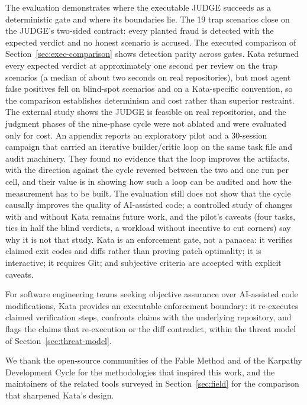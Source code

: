 \documentclass{sbc2019}%
\begin{document}
The evaluation demonstrates where the executable JUDGE succeeds as a
deterministic gate and where its boundaries lie. The 19 trap scenarios close
on the JUDGE's two-sided contract: every planted fraud is detected with the
expected verdict and no honest scenario is accused. The executed comparison of
Section~\ref{sec:exec-comparison} shows detection parity across gates. Kata
returned every expected verdict at approximately one second per review on the
trap scenarios (a median of about two seconds on real repositories), but most
agent false positives fell on blind-spot scenarios and on a Kata-specific
convention, so the comparison establishes determinism and cost rather than
superior restraint. The external study shows the JUDGE is feasible on real
repositories, and the judgment phases of the nine-phase cycle were not
ablated and were evaluated only for cost. An appendix reports an exploratory
pilot and a 30-session campaign that carried an iterative builder/critic loop
on the same task file and audit machinery. They found no evidence that the loop
improves the artifacts, with the direction against the cycle reversed between
the two and one run per cell, and their value is in showing how such a loop can
be audited and how the measurement has to be built. The evaluation still does not
show that the cycle causally improves the quality of AI-assisted code;
a controlled study of changes with and without Kata remains future work, and the
pilot's caveats (four tasks, ties in half the blind verdicts, a workload without
incentive to cut corners) say why it is not that study. Kata is an enforcement gate, not a panacea: it verifies claimed exit codes and diffs
rather than proving patch optimality; it is interactive; it requires Git; and
subjective criteria are accepted with explicit caveats.

For software engineering teams seeking objective assurance over AI-assisted code
modifications, Kata provides an executable enforcement boundary: it re-executes
claimed verification steps, confronts claims with the underlying repository, and
flags the claims that re-execution or the diff contradict, within the threat
model of Section~\ref{sec:threat-model}.

\begin{acknowledgements}
We thank the open-source communities of the Fable Method \cite{fable} and of
the Karpathy Development Cycle \cite{karpathy} for the methodologies that
inspired this work, and the maintainers of the related tools surveyed in
Section~\ref{sec:field} for the comparison that sharpened Kata's design.
\end{acknowledgements}
\end{document}
